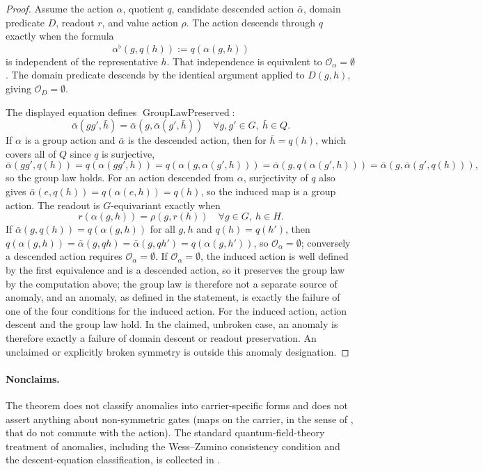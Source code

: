 \begin{proof}
Assume the action \(\alpha\), quotient \(q\), candidate descended
action \(\bar\alpha\), domain predicate \(D\), readout \(r\), and
value action \(\rho\).  The action descends through \(q\) exactly when
the formula
\[
  \alpha^{\flat}(g,q(h)):=q(\alpha(g,h))
\]
is independent of the representative \(h\).  That independence is
equivalent to \(\mathcal O_{\alpha}=\emptyset\).  The domain predicate
descends by the identical argument applied to \(D(g,h)\), giving
\(\mathcal O_D=\emptyset\).

The displayed equation defines \(\operatorname{GroupLawPreserved}\):
\[
  \bar\alpha(gg',\bar h)
  =
  \bar\alpha(g,\bar\alpha(g',\bar h))
  \quad
  \forall g,g'\in G,\ \bar h\in Q.
\]
If \(\alpha\) is a group action and \(\bar\alpha\) is the descended action,
then for \(\bar h=q(h)\), which covers all of \(Q\) since \(q\) is surjective,
\[
  \bar\alpha(gg',q(h))=q(\alpha(gg',h))=q(\alpha(g,\alpha(g',h)))
  =\bar\alpha(g,q(\alpha(g',h)))=\bar\alpha(g,\bar\alpha(g',q(h))),
\]
so the group law holds. For an action descended from \(\alpha\), surjectivity of
\(q\) also gives \(\bar\alpha(e,q(h))=q(\alpha(e,h))=q(h)\), so the induced map
is a group action. The readout is \(G\)-equivariant exactly when
\[
  r(\alpha(g,h))=\rho(g,r(h))
  \quad
  \forall g\in G,\ h\in H.
\]
If \(\bar\alpha(g,q(h))=q(\alpha(g,h))\) for all \(g,h\) and \(q(h)=q(h')\),
then \(q(\alpha(g,h))=\bar\alpha(g,q h)=\bar\alpha(g,q h')=q(\alpha(g,h'))\),
so \(\mathcal O_\alpha=\emptyset\); conversely a descended action requires
\(\mathcal O_\alpha=\emptyset\). If \(\mathcal O_\alpha=\emptyset\), the induced
action is well defined by the first equivalence and is a descended action, so
it preserves the group law by the computation above; the group law is
therefore not a separate source of anomaly, and an anomaly, as defined in the
statement, is exactly the failure of one of the four conditions for the
induced action. For the induced action, action descent and the group law
hold. In the claimed, unbroken case, an anomaly is therefore exactly a failure
of domain descent or readout preservation. An unclaimed or explicitly broken
symmetry is outside this anomaly designation.
\end{proof}

\paragraph{Nonclaims.} The theorem does not classify anomalies
into carrier-specific forms and does not assert anything about
non-symmetric gates (maps on the carrier, in the sense of
, that do not commute with the action).  The standard quantum-field-theory treatment of
anomalies, including the Wess--Zumino consistency condition and the
descent-equation classification, is collected in
\citet{Bertlmann2000Anomalies}.

